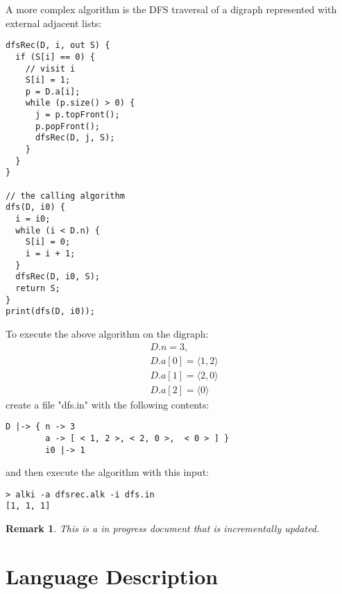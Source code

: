\documentclass[a4paper]{report}
\newtheorem*{remark}{Remark}
\begin{document}
A more complex algorithm is the DFS traversal of a digraph represented with external adjacent lists:
\begin{verbatim}
dfsRec(D, i, out S) {
  if (S[i] == 0) {
    // visit i
    S[i] = 1;
    p = D.a[i];
    while (p.size() > 0) {
      j = p.topFront();
      p.popFront();
      dfsRec(D, j, S);
    }
  }
}

// the calling algorithm
dfs(D, i0) {
  i = i0;
  while (i < D.n) {
    S[i] = 0;
    i = i + 1;
  }
  dfsRec(D, i0, S);
  return S;
}
print(dfs(D, i0));
\end{verbatim}
To execute the above algorithm on the digraph:
\begin{align*}
&D.n = 3,\\
&D.a[0] = \langle 1,2\rangle\\
&D.a[1] = \langle2, 0\rangle\\
&D.a[2] = \langle0\rangle
\end{align*}
create a file "dfs.in" with the following  contents:
\begin{verbatim}
D |-> { n -> 3
        a -> [ < 1, 2 >, < 2, 0 >,  < 0 > ] }
        i0 |-> 1
\end{verbatim}
and then execute the algorithm with this input:
\begin{verbatim}
> alki -a dfsrec.alk -i dfs.in
[1, 1, 1]
\end{verbatim}


%
%
%

\begin{remark}
This is a in progress document that is incrementally updated.
\end{remark}

\chapter{Language Description}
\end{document}
